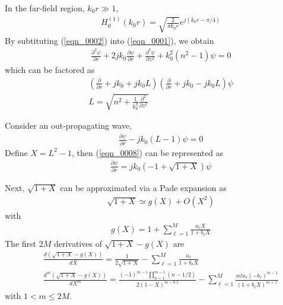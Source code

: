 \documentclass[journal,onecolumn]{IEEEtran}
\begin{document}
In the far-field region, $k_0 r \gg 1$,
\begin{eqnarray}
&&H_0^{(1)}(k_0 r) = \sqrt{\frac{2}{\pi k_0 r}} e ^ {j (k_0 r - \pi / 4) }
\label{eqn_0004}
\end{eqnarray}
By subtituting (\ref{eqn_0002}) into (\ref{eqn_0001}), we obtain
\begin{eqnarray}
&&\frac{\partial^2 \psi}{\partial r} + 2 j k_0 \frac{\partial \psi}{\partial r} + \frac{\partial^2 \psi}{\partial z^2} 
+ k_0^2 (n^2 - 1) \psi = 0
\label{eqn_0005}
\end{eqnarray}
which can be factored as 
\begin{eqnarray}
&&\left(\frac{\partial }{\partial r} + j k_0 + j k_0 L \right) \left(\frac{\partial }{\partial r} + j k_0  - j k_0 L \right) \psi
\label{eqn_0006} \\
&&L = \sqrt{n^2 + \frac{1}{k_0^2} \frac{\partial^2}{\partial z^2}}
\label{eqn_0007}
\end{eqnarray}

Consider an out-propagating wave,
\begin{eqnarray}
&&\frac{\partial \psi }{\partial r} - j k_0 (L - 1) \psi = 0
\label{eqn_0008}
\end{eqnarray}
Define $X = L^2 - 1$, then (\ref{eqn_0008}) can be represented as
\begin{eqnarray}
&&\frac{\partial \psi}{\partial r} = j k_0 (-1 + \sqrt{1 + X}) \psi
\label{eqn_0009}
\end{eqnarray}




Next, $\sqrt{1 + X}$ can be approximated via a Pade expansion as \cite{MDC_HOPA} 
\begin{eqnarray}
&&\sqrt{1 + X} \simeq g(X) + O(X^2)
\label{eqn_0010} 
\end{eqnarray}
with 
\begin{eqnarray}
&&g(X) = 1 + \sum^M_{\ell = 1} \frac{a_\ell X}{1 + b_\ell X}
\label{eqn_0011}
\end{eqnarray}
The first $2M$ derivatives of $\sqrt{1 + X} - g(X)$ are  
\begin{eqnarray}
&&\frac{d (\sqrt{1 + X} - g(X))}{d X} = \frac{1}{2 \sqrt{1 + X}} - \sum^M_{\ell = 1} \frac{ a_\ell}{1 + b_\ell X}
\label{eqn_0012} \\
&&\frac{d^m (\sqrt{1 + X} - g(X))}{d X^m} = \frac{\displaystyle (-1)^{m - 1} \prod^{m - 1}_{n = 1} (n - 1/2) }{2 (1 - X)^{m - 0.5}} 
- \sum^M_{\ell = 1} \frac{m! a_\ell(-b_\ell)^{m - 1}}{(1 + b_\ell X)^{m + 1}} 
\label{eqn_0013} 
\end{eqnarray}
with $1 < m \leq 2M$. 
\end{document}
